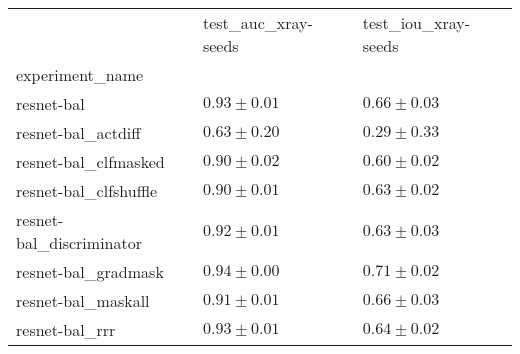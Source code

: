 \begin{tabular}{lll}
\toprule
{} & test_auc_xray-seeds & test_iou_xray-seeds \\
experiment_name          &                     &                     \\
\midrule
resnet-bal               &       $0.93\pm0.01$ &       $0.66\pm0.03$ \\
resnet-bal_actdiff       &       $0.63\pm0.20$ &       $0.29\pm0.33$ \\
resnet-bal_clfmasked     &       $0.90\pm0.02$ &       $0.60\pm0.02$ \\
resnet-bal_clfshuffle    &       $0.90\pm0.01$ &       $0.63\pm0.02$ \\
resnet-bal_discriminator &       $0.92\pm0.01$ &       $0.63\pm0.03$ \\
resnet-bal_gradmask      &       $0.94\pm0.00$ &       $0.71\pm0.02$ \\
resnet-bal_maskall       &       $0.91\pm0.01$ &       $0.66\pm0.03$ \\
resnet-bal_rrr           &       $0.93\pm0.01$ &       $0.64\pm0.02$ \\
\bottomrule
\end{tabular}
